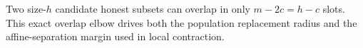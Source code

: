 Two size-\(h\) candidate honest subsets can overlap in only \(m-2c=h-c\) slots. This exact overlap elbow drives both the population replacement radius and the affine-separation margin used in local contraction.